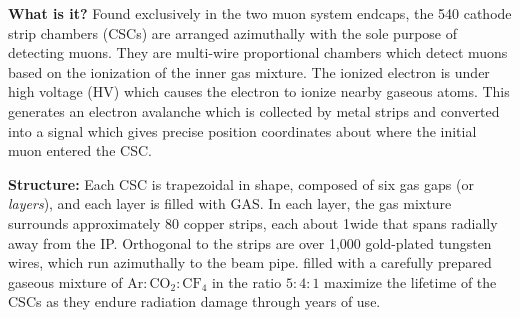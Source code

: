 \textbf{What is it?}
Found exclusively in the two muon system endcaps, the 540 cathode strip chambers (CSCs) are arranged azimuthally with the sole purpose of detecting muons.
They are multi-wire proportional chambers which detect muons based on the ionization of the inner gas mixture.
The ionized electron is under high voltage (HV) which causes the electron to ionize nearby gaseous atoms.
This generates an electron avalanche which is collected by metal strips and converted into a signal which gives precise position coordinates about where the initial muon entered the CSC.

\textbf{Structure:}
Each CSC is trapezoidal in shape, composed of six gas gaps (or \emph{layers}), and each layer is filled with GAS.
In each layer, the gas mixture surrounds approximately 80 copper strips, each about 1\cm wide that spans radially away from the IP.
Orthogonal to the strips
are over 1,000 gold-plated tungsten wires, which run azimuthally to the beam pipe.
filled with a carefully prepared gaseous mixture of $\mathrm{Ar:CO_{2}:CF_{4}}$ in the ratio $5:4:1$ maximize the lifetime of the CSCs as they endure radiation damage through years of use.

